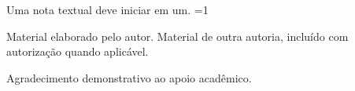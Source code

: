 \documentclass[perfil=artigo]{undftex}
\begin{document}
  \undfinicioartigo
  
  Uma nota textual deve iniciar em um.
  \ifnum\value{footnote}=1\else
  \fi
  \printundfreferences
  \begin{undfglossario}
  \end{undfglossario}
  Material elaborado pelo autor.
  Material de outra autoria, incluído com autorização quando aplicável.
  \begin{agradecimentos}
    Agradecimento demonstrativo ao apoio acadêmico.
  \end{agradecimentos}
\end{document}
